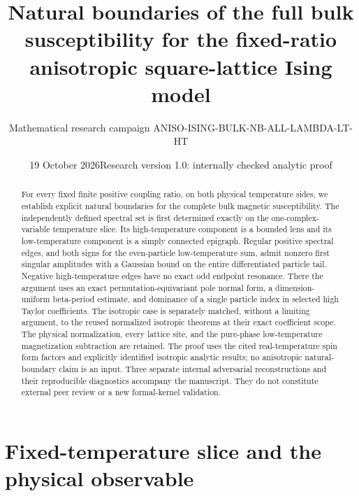 \documentclass[11pt]{article}
\title{Natural boundaries of the full bulk susceptibility\newline
for the fixed-ratio anisotropic square-lattice Ising model}
\author{Mathematical research campaign ANISO-ISING-BULK-NB-ALL-LAMBDA-LT-HT}
\date{19 October 2026\newline Research version 1.0: internally checked analytic proof}
\numberwithin{equation}{section}
\theoremstyle{definition}
\begin{document}
\maketitle
\begin{abstract}
For every fixed finite positive coupling ratio, on both physical
temperature sides, we establish explicit natural boundaries for the
complete bulk magnetic susceptibility. The independently defined
spectral set is first determined exactly on the one-complex-variable
temperature slice. Its high-temperature component is a bounded lens and
its low-temperature component is a simply connected epigraph. Regular
positive spectral edges, and both signs for the even-particle low-temperature
sum, admit nonzero first singular amplitudes with a Gaussian bound on the
entire differentiated particle tail. Negative high-temperature edges have
no exact odd endpoint resonance. There the argument uses an exact
permutation-equivariant pole normal form, a dimension-uniform beta-period
estimate, and dominance of a single particle index in selected high Taylor
coefficients. The isotropic case is separately matched, without a limiting
argument, to the reused normalized isotropic theorems at their exact
coefficient scope. The physical normalization, every lattice site, and the
pure-phase low-temperature magnetization subtraction are retained. The
proof uses the cited real-temperature spin form factors and explicitly
identified isotropic analytic results; no anisotropic natural-boundary
claim is an input. Three separate internal adversarial reconstructions
and their reproducible diagnostics accompany the manuscript. They do not
constitute external peer review or a new formal-kernel validation.
\end{abstract}
\tableofcontents

\section{Fixed-temperature slice and the physical observable}\label{sec:physical}
\end{document}
